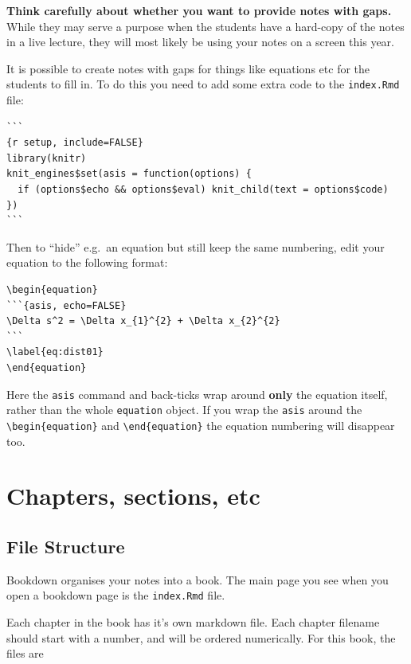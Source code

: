 \documentclass[]{book}
\begin{document}
\textbf{Think carefully about whether you want to provide notes with gaps.} While they may serve a purpose when the students have a hard-copy of the notes in a live lecture, they will most likely be using your notes on a screen this year.

It is possible to create notes with gaps for things like equations etc for the students to fill in. To do this you need to add some extra code to the \texttt{index.Rmd} file:

\begin{verbatim}
```
{r setup, include=FALSE}
library(knitr)
knit_engines$set(asis = function(options) {
  if (options$echo && options$eval) knit_child(text = options$code)
})
```
\end{verbatim}

Then to ``hide'' e.g.~an equation but still keep the same numbering, edit your equation to the following format:

\begin{verbatim}
\begin{equation}
```{asis, echo=FALSE}
\Delta s^2 = \Delta x_{1}^{2} + \Delta x_{2}^{2}
```
\label{eq:dist01}
\end{equation}
\end{verbatim}

Here the \texttt{asis} command and back-ticks wrap around \textbf{only} the equation itself, rather than the whole \texttt{equation} object. If you wrap the \texttt{asis} around the \texttt{\textbackslash{}begin\{equation\}} and \texttt{\textbackslash{}end\{equation\}} the equation numbering will disappear too.

\hypertarget{sec:chapters}{%
\chapter{Chapters, sections, etc}\label{sec:chapters}}

\hypertarget{sec:file-structure}{%
\section{File Structure}\label{sec:file-structure}}

Bookdown organises your notes into a book. The main page you see when you open a bookdown page is the \texttt{index.Rmd} file.

Each chapter in the book has it's own markdown file. Each chapter filename should start with a number, and will be ordered numerically. For this book, the files are
\end{document}
